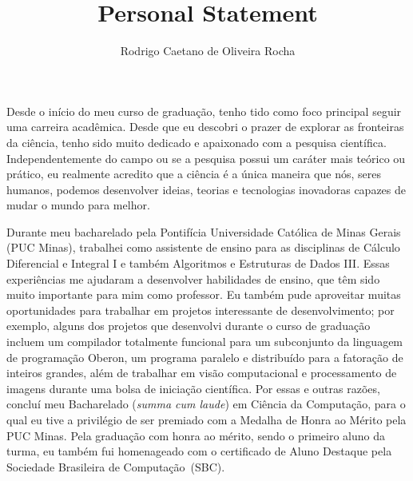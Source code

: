 \documentclass{article}
\title{Personal Statement}
\author{Rodrigo Caetano de Oliveira Rocha}
\date{}
\begin{document}
\maketitle

Desde o in\'{i}cio do meu curso de gradua\c{c}\~{a}o, tenho tido como foco principal
seguir uma carreira acad\^{e}mica. Desde que eu descobri o prazer de
explorar as fronteiras da ci\^{e}ncia, tenho sido muito dedicado e apaixonado
com a pesquisa cient\'{i}fica. Independentemente do campo ou se a pesquisa possui um car\'{a}ter mais
te\'{o}rico ou pr\'{a}tico, eu realmente acredito que a ci\^{e}ncia \'{e} a \'{u}nica maneira
que n\'{o}s, seres humanos, podemos desenvolver ideias, teorias e tecnologias inovadoras capazes de mudar o mundo para melhor.

Durante meu bacharelado pela Pontif\'{i}cia Universidade Cat\'{o}lica de
Minas Gerais (PUC Minas), trabalhei como assistente de ensino para as disciplinas de C\'{a}lculo Diferencial
e Integral I e ​​tamb\'{e}m Algoritmos e Estruturas de Dados III. Essas
experi\^{e}ncias me ajudaram a desenvolver habilidades de ensino, que t\^{e}m sido muito importante
para mim como professor. Eu tamb\'{e}m pude aproveitar muitas oportunidades para trabalhar em projetos interessante
de desenvolvimento; por exemplo, alguns dos projetos que desenvolvi durante
o curso de gradua\c{c}\~{a}o incluem um compilador totalmente funcional para um subconjunto da
linguagem de programa\c{c}\~{a}o Oberon, um programa paralelo e distribu\'{i}do para a fatora\c{c}\~{a}o
de inteiros grandes, al\'{e}m de trabalhar em vis\~{a}o computacional e processamento de imagens durante uma
bolsa de inicia\c{c}\~{a}o cient\'{i}fica. Por essas e outras raz\~{o}es, conclu\'{i} meu
Bacharelado ({\em summa cum laude}) em Ci\^{e}ncia da Computa\c{c}\~{a}o, para o qual eu tive a
privil\'{e}gio de ser premiado com a Medalha de Honra ao M\'{e}rito pela PUC Minas. Pela gradua\c{c}\~{a}o
com honra ao m\'{e}rito, sendo o primeiro aluno da turma, eu tamb\'{e}m fui homenageado com o certificado
de Aluno Destaque pela Sociedade Brasileira de Computa\c{c}\~{a}o~(SBC).
\end{document}
